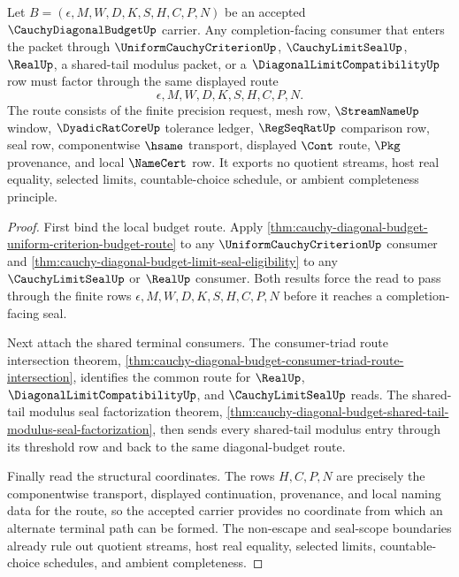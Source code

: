 \begin{theorem}
\label{thm:cauchy-diagonal-budget-terminal-common-route}
Let $B=(\epsilon,M,W,D,K,S,H,C,P,N)$ be an accepted $\CauchyDiagonalBudgetUp$ carrier. Any completion-facing consumer that enters the packet through $\UniformCauchyCriterionUp$, $\CauchyLimitSealUp$, $\RealUp$, a shared-tail modulus packet, or a $\DiagonalLimitCompatibilityUp$ row must factor through the same displayed route
$$
\epsilon,M,W,D,K,S,H,C,P,N.
$$
The route consists of the finite precision request, mesh row, $\StreamNameUp$ window, $\DyadicRatCoreUp$ tolerance ledger, $\RegSeqRatUp$ comparison row, seal row, componentwise $\hsame$ transport, displayed $\Cont$ route, $\Pkg$ provenance, and local $\NameCert$ row. It exports no quotient streams, host real equality, selected limits, countable-choice schedule, or ambient completeness principle.
\end{theorem}
\begin{proof}
First bind the local budget route. Apply \autoref{thm:cauchy-diagonal-budget-uniform-criterion-budget-route} to any $\UniformCauchyCriterionUp$ consumer and \autoref{thm:cauchy-diagonal-budget-limit-seal-eligibility} to any $\CauchyLimitSealUp$ or $\RealUp$ consumer. Both results force the read to pass through the finite rows $\epsilon,M,W,D,K,S,H,C,P,N$ before it reaches a completion-facing seal.

Next attach the shared terminal consumers. The consumer-triad route intersection theorem, \autoref{thm:cauchy-diagonal-budget-consumer-triad-route-intersection}, identifies the common route for $\RealUp$, $\DiagonalLimitCompatibilityUp$, and $\CauchyLimitSealUp$ reads. The shared-tail modulus seal factorization theorem, \autoref{thm:cauchy-diagonal-budget-shared-tail-modulus-seal-factorization}, then sends every shared-tail modulus entry through its threshold row and back to the same diagonal-budget route.

Finally read the structural coordinates. The rows $H,C,P,N$ are precisely the componentwise transport, displayed continuation, provenance, and local naming data for the route, so the accepted carrier provides no coordinate from which an alternate terminal path can be formed. The non-escape and seal-scope boundaries already rule out quotient streams, host real equality, selected limits, countable-choice schedules, and ambient completeness.
\end{proof}

